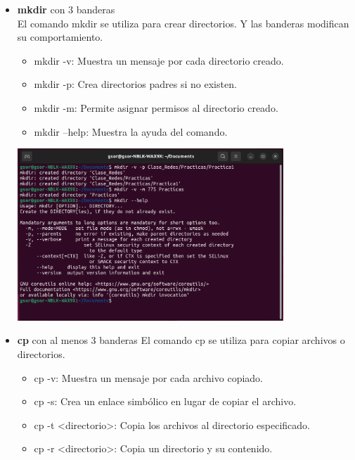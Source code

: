 \begin{itemize}
    \item \textbf{mkdir} con 3 banderas \\
    El comando mkdir se utiliza para crear directorios. Y las banderas modifican su comportamiento.\\
    \begin{itemize}
        \item mkdir -v: Muestra un mensaje por cada directorio creado.\\	
        \item mkdir -p: Crea directorios padres si no existen.\\
        \item mkdir -m: Permite asignar permisos al directorio creado.\\
        \item mkdir --help: Muestra la ayuda del comando.\\
    \end{itemize}
    \begin{center}
            \includegraphics[width=10cm]{IMAGE/comandos/mkdir_examples.png}\\
    \end{center}
    \item \textbf{cp} con al menos 3 banderas
    El comando cp se utiliza para copiar archivos o directorios.\\
    \begin{itemize}
        \item cp -v: Muestra un mensaje por cada archivo copiado.\\
        \item cp -s: Crea un enlace simbólico en lugar de copiar el archivo.\\
        \item cp -t <directorio>: Copia los archivos al directorio especificado.\\
        \item cp -r <directorio>: Copia un directorio y su contenido.\\

\end{itemize}
\end{itemize}
